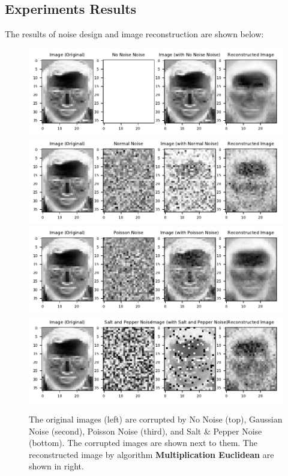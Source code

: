 \subsection{Experiments Results}
The results of noise design and image reconstruction are shown below:
\begin{figure}\label{noises}
	\centering
	\includegraphics[scale=.8]{Result_Multiplication_Euclidean_No_Noise_Comparison}\\
	\includegraphics[scale=.8]{Result_Multiplication_Euclidean_Normal_Comparison}\\
	\includegraphics[scale=.8]{Result_Multiplication_Euclidean_Poisson_Comparison}\\
	\includegraphics[scale=.8]{Result_Multiplication_Euclidean_Salt_and_Pepper_Comparison}\\
	\caption{The original images (left) are corrupted by No Noise (top), Gaussian Noise (second), Poisson Noise (third), and Salt \& Pepper Noise (bottom). The corrupted images are shown next to them. The reconstructed image by algorithm \textbf{Multiplication Euclidean} are shown in right.}
	\label{fig:noise}
\end{figure}
